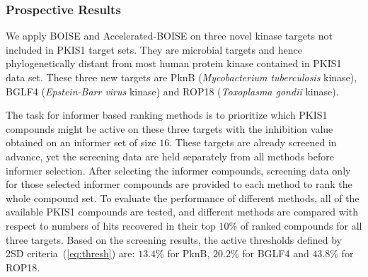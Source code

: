 \documentclass[12pt]{article}
\begin{document}
\subsubsection{Prospective Results}
We apply BOISE and Accelerated-BOISE on three novel kinase targets not included in PKIS1 target sets. They are microbial targets and hence phylogenetically distant from most human protein kinase contained in PKIS1 data set. These three new targets are PknB (\textit{Mycobacterium tuberculosis} kinase), BGLF4 (\textit{Epstein-Barr virus} kinase) and ROP18 (\textit{Toxoplasma gondii} kinase). 

The task for informer based ranking methods is to prioritize which PKIS1 compounds might be active on these three targets with the inhibition value obtained on an informer set of size $16$. These targets are already screened in advance, yet the screening data are held separately from all methods before informer selection. After selecting the informer compounds, screening data only for those selected informer compounds are provided to each method to rank the whole compound set. To evaluate the performance of different methods, all of the available PKIS1 compounds are tested, and different methods are compared with respect to numbers of hits recovered in their top $10\%$ of ranked compounds for all three targets. Based on the screening results, the active thresholds defined by 2SD criteria~(\ref{eq:thresh}) are: $13.4\%$ for PknB, $20.2\%$ for BGLF4 and $43.8\%$ for ROP18.
\end{document}
